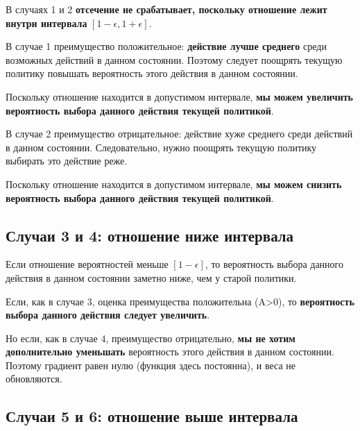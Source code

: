 \documentclass[11pt,a4paper]{article}
\begin{document}
В случаях 1 и 2 \textbf{отсечение не срабатывает, поскольку отношение лежит внутри интервала} \([1 - \epsilon, 1 + \epsilon]\).

В случае 1 преимущество положительное: \textbf{действие лучше среднего} среди возможных действий в данном состоянии. Поэтому следует поощрять текущую политику повышать вероятность этого действия в данном состоянии.

Поскольку отношение находится в допустимом интервале, \textbf{мы можем увеличить вероятность выбора данного действия текущей политикой}.

В случае 2 преимущество отрицательное: действие хуже среднего среди действий в данном состоянии. Следовательно, нужно поощрять текущую политику выбирать это действие реже.

Поскольку отношение находится в допустимом интервале, \textbf{мы можем снизить вероятность выбора данного действия текущей политикой}.

\subsection{Случаи 3 и 4: отношение ниже интервала}\label{case-3-and-4-the-ratio-is-below-the-range}


Если отношение вероятностей меньше \([1 - \epsilon]\), то вероятность выбора данного действия в данном состоянии заметно ниже, чем у старой политики.

Если, как в случае 3, оценка преимущества положительна (A\textgreater0), то \textbf{вероятность выбора данного действия следует увеличить}.

Но если, как в случае 4, преимущество отрицательно, \textbf{мы не хотим дополнительно уменьшать} вероятность этого действия в данном состоянии. Поэтому градиент равен нулю (функция здесь постоянна), и веса не обновляются.

\subsection{Случаи 5 и 6: отношение выше интервала}\label{case-5-and-6-the-ratio-is-above-the-range}
\end{document}
